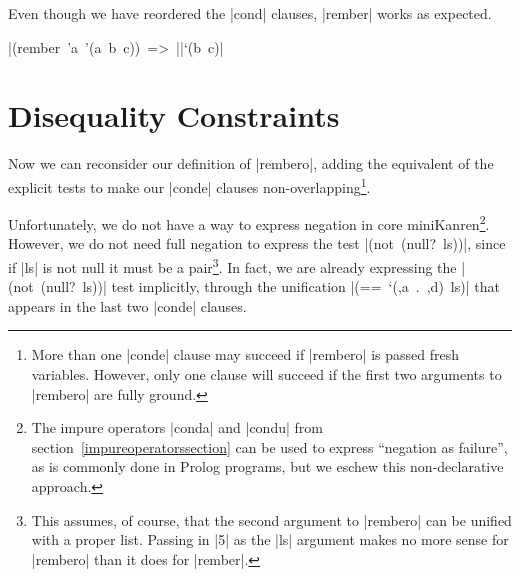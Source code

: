 \noindent Even though we have reordered the \scheme|cond| clauses,
\scheme|rember| works as expected.

\wspace

\noindent\mbox{\scheme|(rember 'a '(a b c)) => |}\mbox{\schemeresult|`(b c)|}

\section{Disequality Constraints}\label{diseqsection}

Now we can reconsider our definition of \mbox{\scheme|rembero|},
adding the equivalent of the explicit tests to make our
\mbox{\scheme|conde|} clauses non-overlapping\footnote{More than one
  \mbox{\scheme|conde|} clause may succeed if \mbox{\scheme|rembero|}
  is passed fresh variables.  However, only one clause will succeed if
  the first two arguments to \mbox{\scheme|rembero|} are fully
  ground.}.

Unfortunately, we do not have a way to express negation in core
miniKanren\footnote{The impure operators \scheme|conda| and
  \scheme|condu| from section~\ref{impureoperatorssection} can be used to express
  ``negation as failure'', as is commonly done in Prolog programs, but
  we eschew this non-declarative approach.}.  However, we do not need
full negation to express the test \mbox{\scheme|(not (null? ls))|},
since if \mbox{\scheme|ls|} is not null it must be a
pair\footnote{This assumes, of course, that the second argument to
  \mbox{\scheme|rembero|} can be unified with a proper list.  Passing
  in \mbox{\scheme|5|} as the \mbox{\scheme|ls|} argument makes no
  more sense for \mbox{\scheme|rembero|} than it does for
  \mbox{\scheme|rember|}.}.  In fact, we are already expressing the
\mbox{\scheme|(not (null? ls))|} test implicitly, through the
unification \mbox{\scheme|(== `(,a . ,d) ls)|} that appears in the
last two \mbox{\scheme|conde|} clauses.

